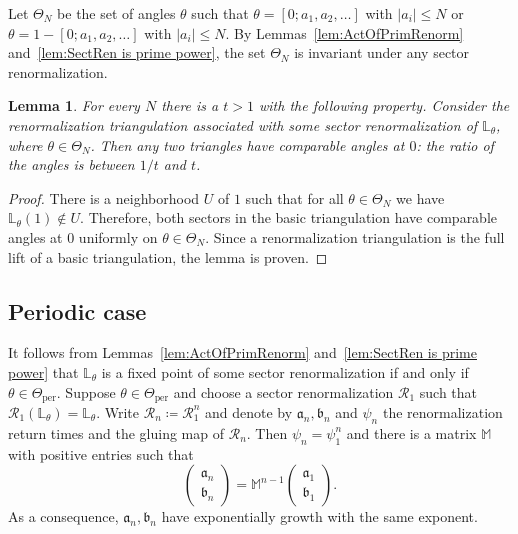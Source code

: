 \documentclass[]{amsart}
\newcommand\RR{\mathcal{R}}
\renewcommand{\aa}{{\mathfrak{a}}}
\newcommand{\bb}{{\mathfrak{b}}}
\newcommand{\Lbb}{{\mathbb L}}
\newtheorem{lem}[thm]{Lemma}
\theoremstyle{remark}
\numberwithin{equation}{section}
\theoremstyle{definition}
\newcommand{\per}{{\mathrm{per}}}
\begin{document}
Let $\Theta_N$ be the set of angles $\theta$ such that $\theta= [0;a_1,a_2,\dots]$ with $|a_i| \le N$ or $\theta= 1-[0;a_1,a_2,\dots]$ with $|a_i| \le N$. By Lemmas~\ref{lem:ActOfPrimRenorm} and~\ref{lem:SectRen is prime power}, the set $\Theta_N$ is invariant under any sector renormalization.

\begin{lem}
\label{lem:ap:CompTiling}
For every $N$ there is a $t>1$ with the following property. Consider the renormalization triangulation associated with some sector renormalization of $\Lbb_\theta$, where $\theta\in \Theta_N$. Then any two triangles have comparable angles at $0$: the ratio of the angles is between $1/t$ and $t$.
\end{lem}
\begin{proof}
There is a neighborhood $U$ of $1$ such that for all $\theta\in \Theta_N$ we have $\Lbb_\theta(1)\not\in U$. Therefore, both sectors in the basic triangulation have comparable angles at $0$ uniformly on $\theta\in \Theta_N$. Since a renormalization triangulation is the full lift of a basic triangulation, the lemma is proven.   
\end{proof}



\subsection{Periodic case}
\label{sss:ap:SectRen:PerCase}
It follows from Lemmas~\ref{lem:ActOfPrimRenorm} and~\ref{lem:SectRen is prime power} that $\Lbb_\theta$ is a fixed point of some sector renormalization if and only if $\theta\in  \Theta_\per$. Suppose  $\theta\in \Theta_\per$ and choose a sector renormalization $\RR_1$ such that $\RR_1(\Lbb_\theta)=\Lbb_\theta$. Write $\RR_n\coloneqq \RR_1^{n}$ and denote by $\aa_n,\bb_n$ and $\psi_n$ the renormalization return times and the gluing map of $\RR_n$. Then $\psi_n=\psi_1^n$ and there is a matrix $\mathbb M$ with positive entries such that
\begin{equation}
 \label{eq:RernReturns}\left(\begin{matrix}
         \aa_n \\ \bb_n
        \end{matrix}\right) =\mathbb M^{n-1} \left(\begin{matrix}
         \aa_1 \\ \bb_1
        \end{matrix}\right). 
\end{equation}
As a consequence, $\aa_n, \bb_n$ have exponentially growth with the same exponent. 
\end{document}
